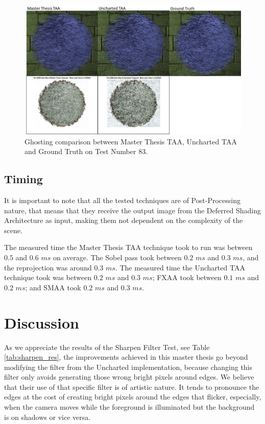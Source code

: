\documentclass{cslthse-msc}
\begin{document}
\begin{figure}[H]
	\centering
	\includegraphics[scale=0.8]{images/results/hairball_ghosting_lighted.png}
	\caption{Ghosting comparison between Master Thesis TAA, Uncharted TAA and Ground Truth on Test Number 83.}\label{fig:hairball_ghosting_lighted}
\end{figure}


\subsection{Timing} \label{result_timing}
It is important to note that all the tested techniques are of Post-Processing nature, that means that they receive the output image from the Deferred Shading Architecture as input, making them not dependent on the complexity of the scene.
 
The measured time the Master Thesis TAA technique took to run was between $0.5$ and $0.6$ $ms$ on average. The Sobel pass took between $0.2$ $ms$ and $0.3$ $ms$, and the reprojection was around $0.3$ $ms$. The measured time the Uncharted TAA technique took was between $0.2$ $ms$ and $0.3$ $ms$; FXAA took between $0.1$ $ms$ and $0.2$ $ms$; and SMAA took $0.2$ $ms$ and $0.3$ $ms$.

\section{Discussion}
As we appreciate the results of the Sharpen Filter Test, see Table \ref{tab:sharpen_res}, the improvements achieved in this master thesis go beyond modifying the filter from the Uncharted implementation, because changing this filter only avoids generating those wrong bright pixels around edges. We believe that their use of that specific filter is of artistic nature. It tends to pronounce the edges at the cost of creating bright pixels around the edges that flicker, especially, when the camera moves while the foreground is illuminated but the background is on shadows or vice versa. 
\end{document}
